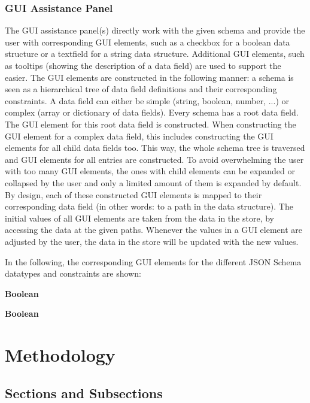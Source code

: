 \documentclass[lettersize,journal]{IEEEtran}
\begin{document}
\subsubsection{GUI Assistance Panel}
The GUI assistance panel(s) directly work with the given schema and provide the user with corresponding GUI elements, such as a checkbox for a boolean data structure or a textfield for a string data structure. Additional GUI elements, such as tooltips (showing the description of a data field) are used to support the easier.
The GUI elements are constructed in the following manner: a schema is seen as a hierarchical tree of data field definitions and their corresponding constraints. A data field can either be simple (string, boolean, number, ...) or complex (array or dictionary of data fields). Every schema has a root data field. The GUI element for this root data field is constructed. When constructing the GUI element for a complex data field, this includes constructing the GUI elements for all child data fields too. This way, the whole schema tree is traversed and GUI elements for all entries are constructed.
To avoid overwhelming the user with too many GUI elements, the ones with child elements can be expanded or collapsed by the user and only a limited amount of them is expanded by default.
By design, each of these constructed GUI elements is mapped to their corresponding data field (in other words: to a path in the data structure). The initial values of all GUI elements are taken from the data in the store, by accessing the data at the given paths. Whenever the values in a GUI element are adjusted by the user, the data in the store will be updated with the new values.

In the following, the corresponding GUI elements for the different JSON Schema datatypes and constraints are shown:

\textbf{Boolean}


\textbf{Boolean}



\section{Methodology}
\subsection{Sections and Subsections}
\end{document}
